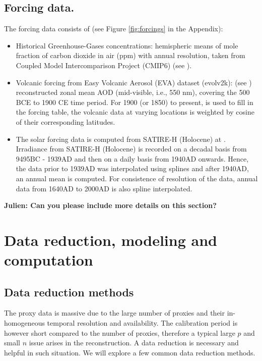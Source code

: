\documentclass[11pt]{amsart}
\theoremstyle{plain}
\theoremstyle{definition}
\theoremstyle{remark}
\begin{document}
\subsection{Forcing data.}
The forcing data consists of (see Figure \ref{fig:forcings} in the Appendix):
\begin{itemize}
\item Historical Greenhouse-Gases concentrations: hemispheric means of mole
  fraction of carbon dioxide in air (ppm) with annual
  resolution, taken from Coupled Model Intercomparison Project (CMIP6) (see
  \cite{Meinshausen2016}).
  
\item Volcanic forcing from Easy Volcanic Aerosol (EVA) dataset (evolv2k): (see
  \cite{Toohey2016}) reconstructed zonal mean AOD (mid-visible, i.e., 550 nm), covering the
  500 BCE to 1900 CE time period. For 1900 (or 1850) to present, \cite{Thomason2016} is
  used to fill in the forcing table, the volcanic data at varying locations is
  weighted by cosine of their corresponding latitudes.
  
\item The solar forcing data is computed from SATIRE-H
  (Holocene) at \cite{Vieira2011}. Irradiance from SATIRE-H (Holocene) is
  recorded on a decadal basis from 9495BC - 1939AD and then on a daily basis
  from 1940AD onwards. Hence, the data prior to 1939AD was interpolated using splines and after 1940AD, an annual mean is computed. For consistence of resolution of the data, annual data from 1640AD to 2000AD is also spline interpolated.
\end{itemize}
\textbf{Julien: Can you please include more details on this section?}

\section{Data reduction, modeling and computation}\label{sec:model}
\subsection{Data reduction methods}
\label{sec:rp}

The proxy data is massive due to the large number of proxies and their in-homogeneous temporal resolution and availability. The calibration period is however short compared to the number of proxies, therefore a typical large $p$ and small $n$ issue arises in the reconstruction. A data reduction is necessary and helpful in such situation. We will explore a few common data reduction methods.    
\end{document}
